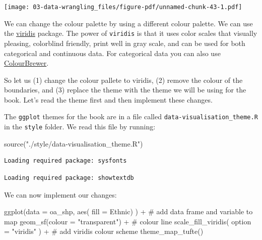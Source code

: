 \documentclass[
  letterpaper,
  DIV=11,
  numbers=noendperiod,
  oneside]{scrreprt}
\newenvironment{Shaded}{\begin{snugshade}}{\end{snugshade}}
\newcommand{\AttributeTok}[1]{\textcolor[rgb]{0.40,0.45,0.13}{#1}}
\newcommand{\CommentTok}[1]{\textcolor[rgb]{0.37,0.37,0.37}{#1}}
\newcommand{\FunctionTok}[1]{\textcolor[rgb]{0.28,0.35,0.67}{#1}}
\newcommand{\NormalTok}[1]{\textcolor[rgb]{0.00,0.23,0.31}{#1}}
\newcommand{\SpecialCharTok}[1]{\textcolor[rgb]{0.37,0.37,0.37}{#1}}
\newcommand{\StringTok}[1]{\textcolor[rgb]{0.13,0.47,0.30}{#1}}
\begin{document}
\texttt{[image: 03-data-wrangling\_files/figure-pdf/unnamed-chunk-43-1.pdf]}

We can change the colour palette by using a different colour palette. We
can use the
\href{https://cran.r-project.org/web/packages/viridis/vignettes/intro-to-viridis.html}{viridis}
package. The power of \texttt{viridis} is that it uses color scales that
visually pleasing, colorblind friendly, print well in gray scale, and
can be used for both categorical and continuous data. For categorical
data you can also use
\href{https://colorbrewer2.org/\#type=sequential&scheme=BuGn&n=3}{ColourBrewer}.

So let us (1) change the colour pallete to viridis, (2) remove the
colour of the boundaries, and (3) replace the theme with the theme we
will be using for the book. Let's read the theme first and then
implement these changes.

The \texttt{ggplot} themes for the book are in a file called
\texttt{data-visualisation\_theme.R} in the \texttt{style} folder. We
read this file by running:

\begin{Shaded}
\begin{Highlighting}[]
\FunctionTok{source}\NormalTok{(}\StringTok{"./style/data{-}visualisation\_theme.R"}\NormalTok{)}
\end{Highlighting}
\end{Shaded}

\begin{verbatim}
Loading required package: sysfonts
\end{verbatim}

\begin{verbatim}
Loading required package: showtextdb
\end{verbatim}

We can now implement our changes:

\begin{Shaded}
\begin{Highlighting}[]
\FunctionTok{ggplot}\NormalTok{(}\AttributeTok{data =}\NormalTok{ oa\_shp, }\FunctionTok{aes}\NormalTok{( }\AttributeTok{fill =}\NormalTok{ Ethnic) ) }\SpecialCharTok{+} \CommentTok{\# add data frame and variable to map}
  \FunctionTok{geom\_sf}\NormalTok{(}\AttributeTok{colour =} \StringTok{"transparent"}\NormalTok{) }\SpecialCharTok{+} \CommentTok{\# colour line}
  \FunctionTok{scale\_fill\_viridis}\NormalTok{( }\AttributeTok{option =} \StringTok{"viridis"}\NormalTok{ ) }\SpecialCharTok{+} \CommentTok{\# add viridis colour scheme}
  \FunctionTok{theme\_map\_tufte}\NormalTok{()}
\end{Highlighting}
\end{Shaded}
\end{document}

